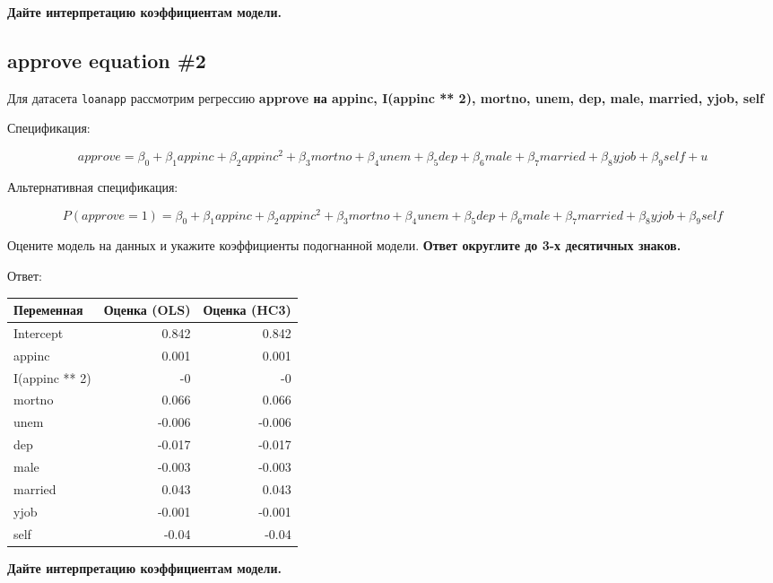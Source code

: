 \documentclass[
  russian,
]{article}
\newcounter{none} %
\begin{document}
\textbf{Дайте интерпретацию коэффициентам модели.}

\subsection{approve equation \#2}\label{approve-equation-2}

Для датасета \texttt{loanapp} рассмотрим регрессию \textbf{approve на
appinc, I(appinc ** 2), mortno, unem, dep, male, married, yjob, self}

Спецификация:

\begin{equation}
approve=\beta_0 + \beta_1 appinc + \beta_2 appinc^{2} + \beta_3 mortno+\beta_4 unem + \beta_5 dep + \beta_6 male + \beta_7 married + \beta_8 yjob + \beta_9 self + u
\end{equation}

Альтернативная спецификация:

\begin{equation}
P(approve=1)=\beta_0 + \beta_1 appinc + \beta_2 appinc^{2} + \beta_3 mortno+\beta_4 unem + \beta_5 dep + \beta_6 male + \beta_7 married + \beta_8 yjob + \beta_9 self
\end{equation}

Оцените модель на данных и укажите коэффициенты подогнанной модели.
\textbf{Ответ округлите до 3-х десятичных знаков.}

Ответ:

{\def\LTcaptype{none} %
\begin{longtable}[]{@{}lrr@{}}
\toprule\noalign{}
Переменная & Оценка (OLS) & Оценка (HC3) \\
\midrule\noalign{}
\endhead
\bottomrule\noalign{}
\endlastfoot
Intercept & 0.842 & 0.842 \\
appinc & 0.001 & 0.001 \\
I(appinc ** 2) & -0 & -0 \\
mortno & 0.066 & 0.066 \\
unem & -0.006 & -0.006 \\
dep & -0.017 & -0.017 \\
male & -0.003 & -0.003 \\
married & 0.043 & 0.043 \\
yjob & -0.001 & -0.001 \\
self & -0.04 & -0.04 \\
\end{longtable}
}

\textbf{Дайте интерпретацию коэффициентам модели.}
\end{document}
